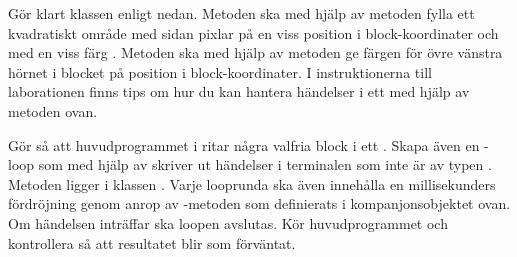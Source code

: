 Gör klart klassen  enligt nedan. Metoden  ska med hjälp av metoden  fylla ett kvadratiskt område med sidan  pixlar på en viss position  i block-koordinater och med en viss färg . Metoden  ska med hjälp av metoden  ge färgen för övre vänstra hörnet i blocket på position  i block-koordinater.
%
%
%
%
%
%
%
I instruktionerna till laborationen \texttt{\LabWeekSIX} finns tips om hur du kan hantera händelser i ett  med hjälp av metoden  ovan.

\Subtask Gör så att huvudprogrammet i  ritar några valfria block i ett . Skapa även en -loop som med hjälp av  skriver ut händelser i terminalen som inte är av typen . Metoden  ligger i klassen . Varje looprunda ska även innehålla en  millisekunders fördröjning genom anrop av -metoden som definierats i kompanjonsobjektet  ovan. Om händelsen  inträffar ska loopen avslutas. Kör huvudprogrammet och kontrollera så att resultatet blir som förväntat.

